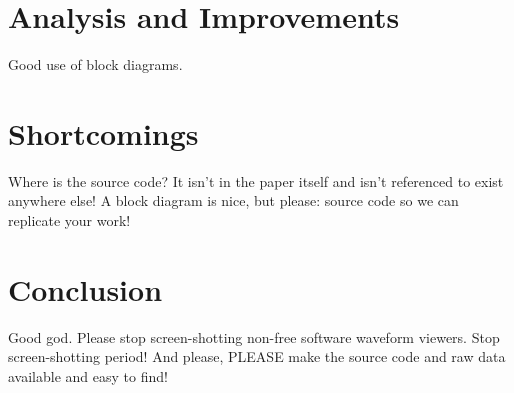 \documentclass[journal,twocolumn]{IEEEtran}
\begin{document}

\section{Analysis and Improvements}

Good use of block diagrams.

\section{Shortcomings}

Where is the source code? It isn't in the paper itself and isn't referenced to
exist anywhere else! A block diagram is nice, but please: source code so we can
replicate your work!

\section{Conclusion}

Good god. Please stop screen-shotting non-free software waveform viewers. Stop 
screen-shotting period! And please, PLEASE make the source code and raw data 
available and easy to find!



\end{document}
